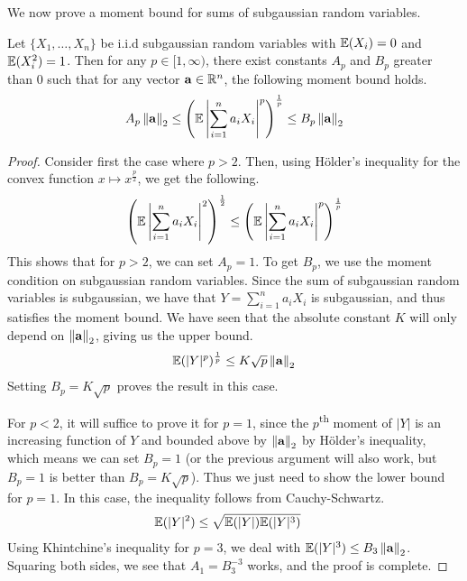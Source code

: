 \documentclass[11pt]{article}
\begin{document}
We now prove a moment bound for sums of subgaussian random variables.
\begin{theorem}
  Let $\{X_1, \ldots, X_n\}$ be i.i.d subgaussian random variables with $\mathbb{E}(X_i) = 0$ and $\mathbb{E}(X_i^2) = 1$.
  Then for any $p \in [1, \infty)$, there exist constants $A_p$ and $B_p$ greater than $0$ such that for any vector $\mathbf{a} \in \mathbb{R}^n$, the following moment bound holds.
  \begin{align*}
    A_p \left\lVert\mathbf{a}\right\rVert_2 \leq \left( \mathbb{E} \left| \sum_{i=1}^n a_i X_i \right|^p \right)^{\frac{1}{p}} \leq  B_p \left\lVert\mathbf{a}\right\rVert_2
  \end{align*}
\end{theorem}
\begin{proof}
  Consider first the case where $p > 2$.
  Then, using Hölder's inequality for the convex function $x \mapsto x^{\frac{p}{2}}$, we get the following.
  \begin{align*}
\left( \mathbb{E} \left| \sum_{i=1}^n a_i X_i \right|^2 \right)^{\frac{1}{2}} \leq \left( \mathbb{E} \left| \sum_{i=1}^n a_i X_i \right|^p \right)^{\frac{1}{p}}
  \end{align*}
  This shows that for $p > 2$, we can set $A_p = 1$.
  To get $B_p$, we use the moment condition on subgaussian random variables.
  Since the sum of subgaussian random variables is subgaussian, we have that $Y = \sum_{i=1}^n a_i X_i$ is subgaussian, and thus satisfies the moment bound.
  We have seen that the absolute constant $K$ will only depend on $\left\lVert\mathbf{a}\right\rVert_2$, giving us the upper bound.
  \begin{align*}
    \mathbb{E}(|Y|^p)^{\frac{1}{p}} \leq K \sqrt{p} \left\lVert\mathbf{a}\right\rVert_2
  \end{align*}
  Setting $B_p = K\sqrt{p}$ proves the result in this case.

  For $p < 2$, it will suffice to prove it for $p = 1$, since the $p$\textsuperscript{th} moment of $|Y|$ is an increasing function of $Y$ and bounded above by $\left\lVert\mathbf{a}\right\rVert_2$ by Hölder's inequality, which means we can set $B_p = 1$ (or the previous argument will also work, but $B_p = 1$ is better than $B_p = K\sqrt{p}$).
  Thus we just need to show the lower bound for $p = 1$.
  In this case, the inequality follows from Cauchy-Schwartz.
  \begin{align*}
    \mathbb{E}(|Y|^2) &\leq \sqrt{\mathbb{E}(|Y|) \mathbb{E}(|Y|^3)}
  \end{align*}
  Using Khintchine's inequality for $p=3$, we deal with $\mathbb{E}(|Y|^3) \leq B_3 \left\lVert\mathbf{a}\right\rVert_2$.
  Squaring both sides, we see that $A_1 = B_3^{-3}$ works, and the proof is complete.
\end{proof}
\end{document}
